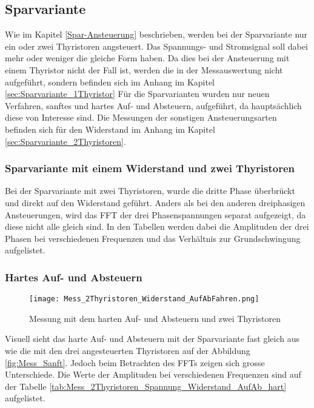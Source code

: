 \subsection{Sparvariante}
Wie im Kapitel \ref{Spar-Ansteuerung} beschrieben, werden bei der Sparvariante nur ein oder zwei Thyristoren angsteuert. Das Spannungs- und Stromsignal soll dabei mehr oder weniger die gleiche Form haben. Da dies bei der Ansteuerung mit einem Thyristor nicht der Fall ist, werden die in der Messauswertung nicht aufgeführt, sondern befinden sich im Anhang im Kapitel \ref{sec:Sparvariante_1Thyristor} Für die Sparvarianten wurden nur neuen Verfahren, sanftes und hartes Auf- und Absteuern, aufgeführt, da hauptsächlich diese von Interesse sind. Die Messungen der sonstigen Ansteuerungsarten befinden sich für den Widerstand im Anhang im Kapitel \ref{sec:Sparvariante_2Thyristoren}.


\subsubsection{Sparvariante mit einem Widerstand und zwei Thyristoren}
Bei der Sparvariante mit zwei Thyristoren, wurde die dritte Phase überbrückt und direkt auf den Widerstand geführt. Anders als bei den anderen dreiphasigen Ansteuerungen, wird das FFT der drei Phasenspannungen separat aufgezeigt, da diese nicht alle gleich sind. In den Tabellen werden dabei die Amplituden der drei Phasen bei verschiedenen Frequenzen und das Verhältnis zur Grundschwingung aufgelistet. 


\subsubsection*{Hartes Auf- und Absteuern}

\begin{figure}[ht!]
	\centering
	\texttt{[image: Mess\_2Thyristoren\_Widerstand\_AufAbFahren.png]}	
	\caption{Messung mit dem harten Auf- und Absteuern und zwei Thyristoren}\label{Mess_2Thyristoren_Widerstand_AufAbFahren}	
\end{figure}

Visuell sieht das harte Auf- und Absteuern mit der Sparvariante fast gleich aus wie die mit den drei angesteuerten Thyristoren auf der Abbildung \ref{fig:Mess_Sanft}. Jedoch beim Betrachten des FFTs zeigen sich grosse Unterschiede. Die Werte der Amplituden bei verschiedenen Frequenzen sind auf der Tabelle \ref{tab:Mess_2Thyristoren_Spannung_Widerstand_AufAb_hart} aufgelistet.

